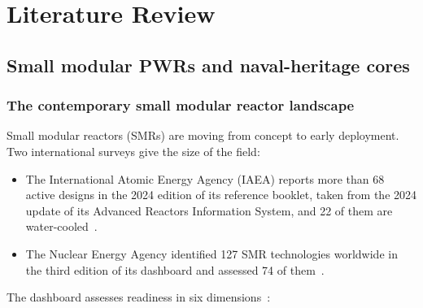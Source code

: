\providecommand{\openpoint}[1]{\par\noindent\fbox{\parbox{0.97\linewidth}{%
  \textbf{Open point:} #1}}\par}

\chapter{Literature Review}
\label{ch:litreview}

\section{Small modular PWRs and naval-heritage cores}
\label{sec:smr-naval}

\subsection{The contemporary small modular reactor landscape}
\label{subsec:smr-landscape}

Small modular reactors (SMRs) are moving from concept to early
deployment. Two international surveys give the size of the field:

\begin{itemize}
  \item The International Atomic Energy Agency (IAEA) reports more than
        68 active designs in the 2024 edition of its reference booklet,
        taken from the 2024 update of its Advanced Reactors Information
        System, and 22 of them are water-cooled~\cite{iaea_smr_2024}.

  \item The Nuclear Energy Agency identified 127 SMR technologies
        worldwide in the third edition of its dashboard and assessed 74
        of them~\cite{nea_dashboard_2025}.
\end{itemize}

The dashboard assesses readiness in six
dimensions~\cite{nea_dashboard_2025}:

